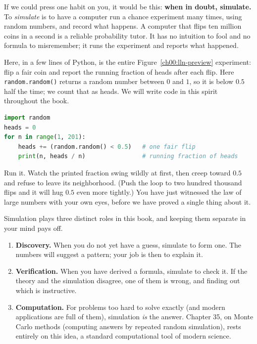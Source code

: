 If we could press one habit on you, it would be this: \textbf{when in doubt,
simulate.} To \emph{simulate} is to have a computer run a chance experiment
many times, using random numbers, and record what happens. A computer that
flips ten million coins in a second is a
reliable probability tutor. It has no intuition to fool and no formula
to misremember; it runs the experiment and reports what happened.

\begin{labbox}
Here, in a few lines of Python, is the entire Figure~\ref{ch00:lln-preview}
experiment: flip a fair coin and report the running fraction of heads after each
flip. Here \texttt{random.random()} returns a random number between $0$ and
$1$, so it is below $0.5$ half the time; we count that as heads. We will write
code in this spirit throughout the book.
\begin{lstlisting}[language=Python]
import random
heads = 0
for n in range(1, 201):
    heads += (random.random() < 0.5)   # one fair flip
    print(n, heads / n)                # running fraction of heads
\end{lstlisting}
Run it. Watch the printed fraction swing wildly at first, then creep toward
$0.5$ and refuse to leave its neighborhood. (Push the loop to two hundred
thousand flips and it will hug $0.5$ even more tightly.) You have just witnessed
the law of large numbers with your own eyes, before we have proved a single
thing about it.
\end{labbox}

Simulation plays three distinct roles in this book, and keeping them
separate in your mind pays off.

\begin{enumerate}
  \item \textbf{Discovery.} When you do not yet have a guess, simulate to form
    one. The numbers will suggest a pattern; your job is then to explain it.
  \item \textbf{Verification.} When you have derived a formula, simulate to
    check it. If the theory and the simulation disagree, one of them is wrong,
    and finding out which is instructive.
  \item \textbf{Computation.} For problems too hard to solve exactly (and modern
    applications are full of them), simulation \emph{is} the answer. Chapter 35,
    on Monte Carlo methods (computing answers by repeated random simulation),
    rests entirely on this idea, a standard computational tool of modern science.
\end{enumerate}

